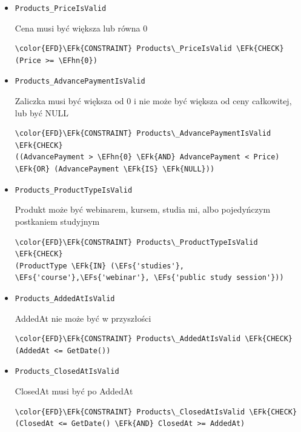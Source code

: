\documentclass[11pt]{article}
\newcommand{\EFs}[1]{\textcolor{EFs}{#1}} %
\newcommand{\EFk}[1]{\textcolor{EFk}{\textbf{#1}}} %
\newcommand{\EFhn}[1]{\textcolor{EFhn}{#1}} %
\begin{document}
\begin{itemize}
\item \texttt{Products\_PriceIsValid}

Cena musi być większa lub równa 0
\begin{Code}
\begin{Verbatim}
\color{EFD}\EFk{CONSTRAINT} Products\_PriceIsValid \EFk{CHECK}
(Price >= \EFhn{0})
\end{Verbatim}
\end{Code}
\item \texttt{Products\_AdvancePaymentIsValid}

Zaliczka musi być większa od 0 i nie może być większa od ceny całkowitej, lub być NULL
\begin{Code}
\begin{Verbatim}
\color{EFD}\EFk{CONSTRAINT} Products\_AdvancePaymentIsValid \EFk{CHECK}
((AdvancePayment > \EFhn{0} \EFk{AND} AdvancePayment < Price)
\EFk{OR} (AdvancePayment \EFk{IS} \EFk{NULL}))
\end{Verbatim}
\end{Code}
\item \texttt{Products\_ProductTypeIsValid}

Produkt może być webinarem, kursem, studia mi, albo pojedyńczym postkaniem studyjnym
\begin{Code}
\begin{Verbatim}
\color{EFD}\EFk{CONSTRAINT} Products\_ProductTypeIsValid \EFk{CHECK}
(ProductType \EFk{IN} (\EFs{'studies'}, \EFs{'course'},\EFs{'webinar'}, \EFs{'public study session'}))
\end{Verbatim}
\end{Code}
\item \texttt{Products\_AddedAtIsValid}

AddedAt nie może być w przyszłości
\begin{Code}
\begin{Verbatim}
\color{EFD}\EFk{CONSTRAINT} Products\_AddedAtIsValid \EFk{CHECK}
(AddedAt <= GetDate())
\end{Verbatim}
\end{Code}
\item \texttt{Products\_ClosedAtIsValid}

ClosedAt musi być po AddedAt
\begin{Code}
\begin{Verbatim}
\color{EFD}\EFk{CONSTRAINT} Products\_ClosedAtIsValid \EFk{CHECK}
(ClosedAt <= GetDate() \EFk{AND} ClosedAt >= AddedAt)
\end{Verbatim}
\end{Code}
\end{itemize}
\end{document}
